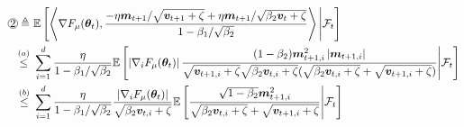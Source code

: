 \begin{appendices}
\begin{equation}
\begin{aligned}
\circled{2} \triangleq \,\,& \E\left[\left\langle \nabla F_{\mu}(\vtheta_t), \frac{-\eta\vm_{t+1}/\sqrt{\vv_{t+1} + \zeta} + \eta\vm_{t+1} / \sqrt{\beta_2\vv_{t} + \zeta}}{1-\beta_1/\sqrt{\beta_2}}\right\rangle \Bigg| \gF_t \right] \\
\stackrel{(a)}{\leq}\,\,& \sum_{i=1}^d\frac{\eta}{1-\beta_1/\sqrt{\beta_2}}\E\left[\left|\nabla_i F_{\mu}(\vtheta_t)\right|\frac{(1-\beta_2)\vm_{t+1,i}^2 \left|\vm_{t+1,i}\right|}{\sqrt{\vv_{t+1,i} + \zeta}\sqrt{\beta_2\vv_{t,i} + \zeta}(\sqrt{\beta_2\vv_{t,i} + \zeta} + \sqrt{\vv_{t+1,i} + \zeta})} \Bigg| \gF_t \right] \\
\stackrel{(b)}{\leq}\,\,& \sum_{i=1}^d\frac{\eta}{1-\beta_1/\sqrt{\beta_2}}\frac{\left|\nabla_i F_{\mu}(\vtheta_t)\right|}{\sqrt{\beta_2\vv_{t,i} + \zeta}}\E\left[\frac{\sqrt{1-\beta_2}\vm_{t+1,i}^2 }{\sqrt{\beta_2\vv_{t,i} + \zeta} + \sqrt{\vv_{t+1,i} + \zeta}} \Bigg| \gF_t \right] \\

\end{aligned}
\end{equation}
\end{appendices}
